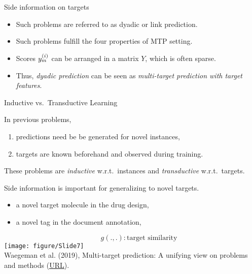 \documentclass[11pt,compress,t,notes=noshow, xcolor=table]{beamer}
\begin{document}
\begin{vbframe}{Side information on targets}
\begin{itemize}
        \item Such problems are referred to as dyadic or link  prediction.
        
        \item Such problems fulfill the four properties of MTP setting.
        
        \item Scores $y^{(i)}_m$ can be arranged in a matrix $Y$, which is often sparse. 
        
        \item Thus, \emph{dyadic prediction} can be seen as \emph{multi-target prediction with target features}. 
    \end{itemize}
\end{vbframe}


\begin{frame}{Inductive vs.\ Transductive Learning}
	\begin{itemize} 
		\item In previous problems, 
		\begin{enumerate}
			\item predictions need be be generated for novel instances, 
			\item targets are known beforehand and observed during training.
		\end{enumerate}
		\item These problems are \emph{inductive} w.r.t.\ instances and \emph{transductive} w.r.t.\ targets.

		\begin{minipage}{0.45\textwidth}    
			\item Side information is important for generalizing to novel targets.
            \begin{itemize}
                \item a novel target molecule in the drug design,
                \item a novel tag in the document annotation,
            \end{itemize} 
		\end{minipage}
        \hfill
		\begin{minipage}{0.45\textwidth}    
			\begin{center}
			
				\tiny{$$\qquad g(.,.): \mbox{target similarity}$$}
				\texttt{[image: figure/Slide7]}  \tiny
				\\ Waegeman et al. (2019), Multi-target prediction:
				A unifying view on problems and methods (\href{https://arxiv.org/pdf/1809.02352.pdf}{\underline{URL}}).
	
			\end{center}
		\end{minipage}
	\end{itemize}
\end{frame}
\end{document}
